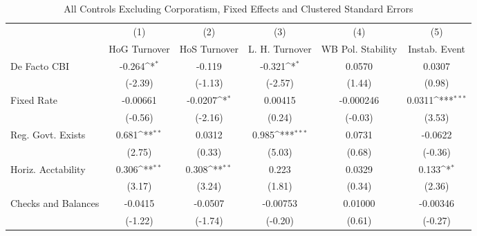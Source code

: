 \begin{table}[htbp]\centering
\def\sym#1{\ifmmode^{#1}\else\(^{#1}\)\fi}
\caption{All Controls Excluding Corporatism, Fixed Effects and Clustered Standard Errors \label{nccmultIndFEDF}}
\begin{tabular}{l*{5}{c}}
\toprule
                                        &\multicolumn{1}{c}{(1)}&\multicolumn{1}{c}{(2)}&\multicolumn{1}{c}{(3)}&\multicolumn{1}{c}{(4)}&\multicolumn{1}{c}{(5)}\\
                                        &\multicolumn{1}{c}{HoG Turnover}&\multicolumn{1}{c}{HoS Turnover}&\multicolumn{1}{c}{L. H. Turnover}&\multicolumn{1}{c}{WB Pol. Stability}&\multicolumn{1}{c}{Instab. Event}\\
\midrule
De Facto CBI                            &   -0.264\sym{*}  &   -0.119         &   -0.321\sym{*}  &   0.0570         &   0.0307         \\
                                        &  (-2.39)         &  (-1.13)         &  (-2.57)         &   (1.44)         &   (0.98)         \\
\addlinespace
Fixed Rate                              & -0.00661         &  -0.0207\sym{*}  &  0.00415         &-0.000246         &   0.0311\sym{***}\\
                                        &  (-0.56)         &  (-2.16)         &   (0.24)         &  (-0.03)         &   (3.53)         \\
\addlinespace
Reg. Govt. Exists                       &    0.681\sym{**} &   0.0312         &    0.985\sym{***}&   0.0731         &  -0.0622         \\
                                        &   (2.75)         &   (0.33)         &   (5.03)         &   (0.68)         &  (-0.36)         \\
\addlinespace
Horiz. Acctability                      &    0.306\sym{**} &    0.308\sym{**} &    0.223         &   0.0329         &    0.133\sym{*}  \\
                                        &   (3.17)         &   (3.24)         &   (1.81)         &   (0.34)         &   (2.36)         \\
\addlinespace
Checks and Balances                     &  -0.0415         &  -0.0507         & -0.00753         &  0.01000         & -0.00346         \\
                                        &  (-1.22)         &  (-1.74)         &  (-0.20)         &   (0.61)         &  (-0.27)         \\

\end{tabular}
\end{table}
